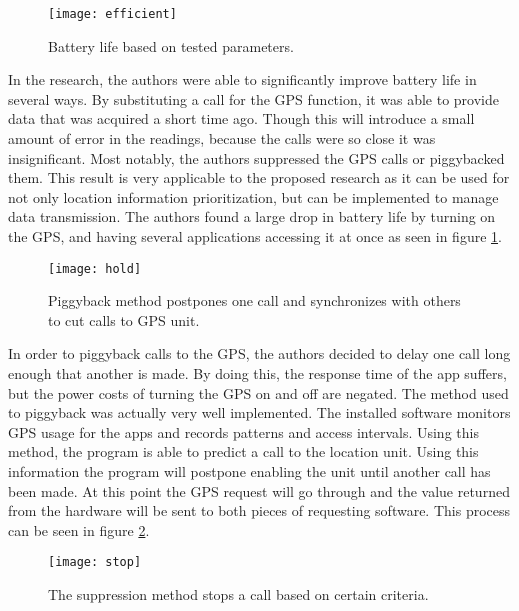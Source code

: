 \documentclass[11pt]{article}
\begin{document}
\begin{figure}
\begin{center}
\texttt{[image: efficient]}
\caption{\label{fig:efficient} Battery life based on tested parameters.}
\end{center}
\end{figure}

In the research, the authors were able to significantly improve battery life in several ways. By substituting a call for the GPS function, it was able to provide data that was acquired a short time ago. Though this will introduce a small amount of error in the readings, because the calls were so close it was insignificant. Most notably, the authors suppressed the GPS calls or piggybacked them. This result is very applicable to the proposed research as it can be used for not only location information prioritization, but can be implemented to manage data transmission. The authors found a large drop in battery life by turning on the GPS, and having several applications accessing it at once as seen in figure \ref{fig:efficient}.

\begin{figure}
\begin{center}
\texttt{[image: hold]}
\caption{\label{fig:hold} Piggyback method postpones one call and synchronizes with others to cut calls to GPS unit.}
\end{center}
\end{figure}

In order to piggyback calls to the GPS, the authors decided to delay one call long enough that another is made. By doing this, the response time of the app suffers, but the power costs of turning the GPS on and off are negated. The method used to piggyback was actually very well implemented. The installed software monitors GPS usage for the apps and records patterns and access intervals. Using this method, the program is able to predict a call to the location unit. Using this information the program will postpone enabling the unit until another call has been made. At this point the GPS request will go through and the value returned from the hardware will be sent to both pieces of requesting software. This process can be seen in figure \ref{fig:hold}.

\begin{figure}
\begin{center}
\texttt{[image: stop]}
\caption{\label{fig:stop} The suppression method stops a call based on certain criteria.}
\end{center}
\end{figure}
\end{document}
